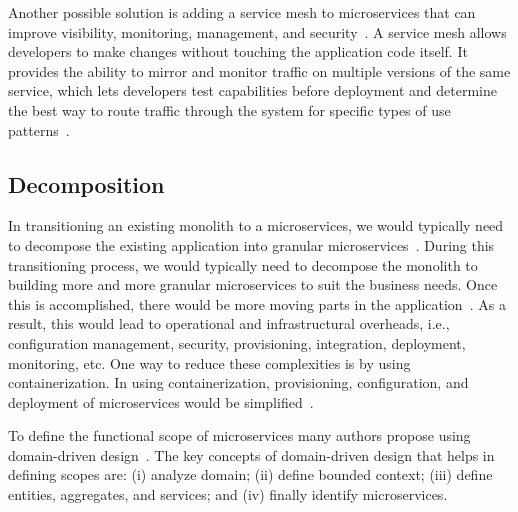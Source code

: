 Another possible solution is adding a service mesh to microservices that can improve visibility, monitoring, management, and security~\cite{Zaytev2018, Ndungu2019}. A service mesh allows developers to make changes without touching the application code itself. It provides the ability to mirror and monitor traffic on multiple versions of the same service, which lets developers test capabilities before deployment and determine the best way to route traffic through the system for specific types of use patterns~\cite{Premchand2018, gozneli2020}.



\subsection{Decomposition}%

In transitioning an existing monolith to a microservices, we would typically need to decompose the existing application into granular microservices~\cite{Taibi2019}. During this transitioning process, we would typically need to decompose the monolith to building more and more granular microservices to suit the business needs. Once this is accomplished, there would be more moving parts in the application~\cite{Carvalho2019}. As a result, this would lead to operational and infrastructural overheads, i.e., configuration management, security, provisioning, integration, deployment, monitoring, etc. One way to reduce these complexities is by using containerization. In using containerization, provisioning, configuration, and deployment of microservices would be simplified~\cite{Zhang2019}.

To define the functional scope of microservices many authors propose using domain-driven design~\cite{Merson2020, neves2019, Zrzavy2020}. 
The key concepts of domain-driven design that helps in defining scopes are:
(i) analyze domain;
(ii) define bounded context;
(iii) define entities, aggregates, and services;
and (iv) finally identify microservices. 


